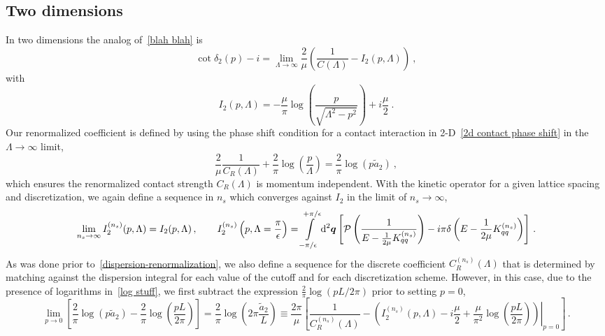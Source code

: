 \subsection{Two dimensions}

In two dimensions the analog of~\eqref{blah blah} is
\begin{equation}
\cot \delta_2(p) - i =\lim_{\Lambda\to\infty}\frac{2}{\mu}\left(\frac{1}{C(\Lambda)}- I_2(p, \Lambda)\right)\ , %
\end{equation}
with
\begin{equation}
I_2(p, \Lambda)
=
-\frac{\mu}{\pi } \log \left(\frac{p}{\sqrt{\Lambda ^2-p^2}}\right)
+ i\frac{\mu }{2}
\ .
\end{equation}
Our renormalized coefficient is defined by using the phase shift condition for a contact interaction in 2-D~\eqref{2d contact phase shift} in the $\Lambda\to\infty$ limit,
\begin{equation}\label{eq:log stuff}
	\frac{2}{\mu}\frac{1}{C_R(\Lambda)} + \frac{2}{\pi } \log \left(\frac{p}{\Lambda}\right)
	=
	\frac { 2 } { \pi } \log \left( p \tilde a _ { 2 } \right)\ ,
\end{equation}
which ensures the renormalized contact strength $C_R(\Lambda)$ is momentum independent.
With the kinetic operator for a given lattice spacing and discretization, we again define a sequence in $n_s$ which converges against $I_2$ in the limit of $n_s \to \infty$,
\begin{equation}
	\lim\limits_{n_s \to \infty} I^{(n_s)}_2(p, \Lambda) = I_2(p, \Lambda)
	\, , \qquad
	I^{(n_s)}_2\left(p, \Lambda=\frac{\pi}{\epsilon} \right)
	=
	    \int\limits_{-\pi/\epsilon}^{+\pi/\epsilon}
        \mathrm{d}^2 \boldsymbol{q}
        \left[
            \mathcal{P} \left(
                \frac{1}{
                    E - \frac{1}{2\mu} K_{qq}^{(n_s)} }
                \right)
            -i \pi \delta\left(E - \frac{1}{2\mu}K_{qq}^{(n_s)}\right)
        \right]
        \, .
\end{equation}
As was done prior to~\eqref{dispersion-renormalization}, we also define a sequence for the discrete coefficient $C^{(n_s)}_R(\Lambda)$ that is determined by matching against the dispersion integral for each value of the cutoff and for each discretization scheme.  However, in this case, due to the presence of logarithms in~\eqref{log stuff}, we first subtract the expression $\frac{2}{\pi}\log(pL/2\pi)$ prior to setting $p=0$,
\begin{equation}
	\lim\limits_{p\to 0}
	\left[
		\frac { 2 } { \pi } \log \left( p \tilde a _ { 2 } \right)-\frac{2}{\pi } \log \left(\frac{pL}{2\pi}\right)
	\right]
	=
	\frac { 2 } { \pi } \log \left(2\pi \frac{\tilde a _ { 2 }}{L} \right)
	\equiv
	\frac{2 \pi}{\mu}
		\left[
		\frac{1}{C_R^{(n_s)}(\Lambda)} - \left.\left(I_2^{(n_s)}(p, \Lambda) - i\frac{\mu}{2}+\frac{\mu}{\pi^2} \log \left(\frac{pL}{2\pi}\right)\right)\right|_{p=0}
		\right]
	\, .
\end{equation}
